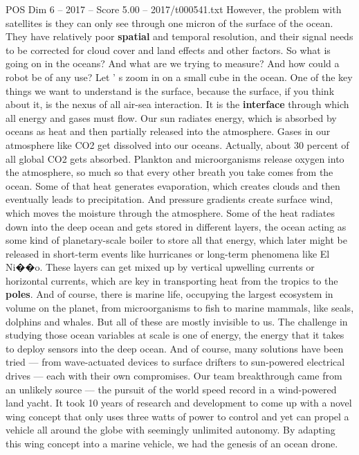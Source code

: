 \begin{textsample}{POS Dim 6 – 2017 – Score 5.00 – 2017/t000541.txt}
However, the problem with satellites is they can only see through one micron of the surface of the ocean.
They have relatively poor \textbf{spatial} and temporal resolution, and their signal needs to be corrected for cloud cover and land effects and other factors.
So what is going on in the oceans?
And what are we trying to measure?
And how could a robot be of any use?
Let ' s zoom in on a small cube in the ocean.
One of the key things we want to understand is the surface, because the surface, if you think about it, is the nexus of all air-sea interaction.
It is the \textbf{interface} through which all energy and gases must flow.
Our sun radiates energy, which is absorbed by oceans as heat and then partially released into the atmosphere.
Gases in our atmosphere like CO2 get dissolved into our oceans.
Actually, about 30 percent of all global CO2 gets absorbed.
Plankton and microorganisms release oxygen into the atmosphere, so much so that every other breath you take comes from the ocean.
Some of that heat generates evaporation, which creates clouds and then eventually leads to precipitation.
And pressure gradients create surface wind, which moves the moisture through the atmosphere.
Some of the heat radiates down into the deep ocean and gets stored in different layers, the ocean acting as some kind of planetary-scale boiler to store all that energy, which later might be released in short-term events like hurricanes or long-term phenomena like El Ni{\EmojiFont �}{\EmojiFont �}o.
These layers can get mixed up by vertical upwelling currents or horizontal currents, which are key in transporting heat from the tropics to the \textbf{poles}.
And of course, there is marine life, occupying the largest ecosystem in volume on the planet, from microorganisms to fish to marine mammals, like seals, dolphins and whales.
But all of these are mostly invisible to us.
The challenge in studying those ocean variables at scale is one of energy, the energy that it takes to deploy sensors into the deep ocean.
And of course, many solutions have been tried — from wave-actuated devices to surface drifters to sun-powered electrical drives — each with their own compromises.
Our team breakthrough came from an unlikely source — the pursuit of the world speed record in a wind-powered land yacht.
It took 10 years of research and development to come up with a novel wing concept that only uses three watts of power to control and yet can propel a vehicle all around the globe with seemingly unlimited autonomy.
By adapting this wing concept into a marine vehicle, we had the genesis of an ocean drone.

\end{textsample}
